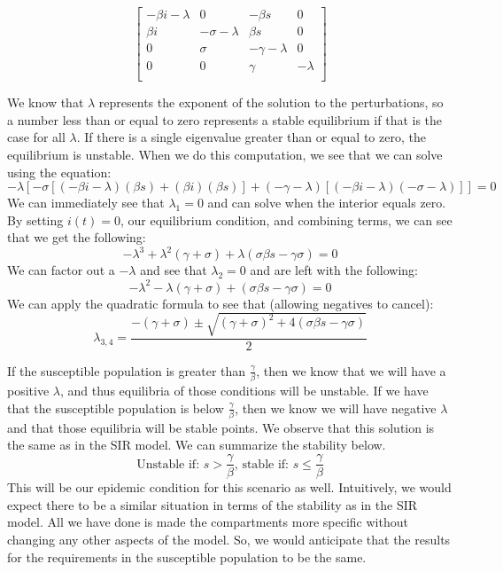 \documentclass[12pt, a4paper]{article}
\begin{document}
        $$\begin{bmatrix}
            -\beta i -\lambda & 0 & -\beta s & 0 \\
            \beta i & -\sigma -\lambda & \beta s & 0 \\
            0 & \sigma & -\gamma -\lambda & 0 \\
            0 & 0 & \gamma & -\lambda \\
        \end{bmatrix}$$
        
        We know that $\lambda$ represents the exponent of the solution to the perturbations, so a number less than or equal to zero represents a stable equilibrium if that is the case for all $\lambda$. If there is a single eigenvalue greater than or equal to zero, the equilibrium is unstable. When we do this computation, we see that we can solve using the equation:
        \[
        -\lambda [-\sigma[(-\beta i- \lambda)(\beta s) + (\beta i)(\beta s)]+(-\gamma-\lambda)[(-\beta i -\lambda)(-\sigma-\lambda)]]=0
        \]
        We can immediately see that $\lambda_1=0$ and can solve when the interior equals zero. By setting $i(t)=0$, our equilibrium condition, and combining terms, we can see that we get the following:
        \[
        -\lambda^3+\lambda^2(\gamma + \sigma)+\lambda(\sigma \beta s - \gamma \sigma)=0
        \]
        We can factor out a $-\lambda$ and see that $\lambda_2=0$ and are left with the following:
        \[
        -\lambda^2-\lambda(\gamma + \sigma)+(\sigma \beta s - \gamma \sigma)=0
        \]
        We can apply the quadratic formula to see that (allowing negatives to cancel):
        \[
        \lambda_{3,4}=\frac{-(\gamma + \sigma) \pm \sqrt{(\gamma + \sigma)^2 + 4(\sigma \beta s - \gamma\sigma)}}{2}
        \]
        
        If the susceptible population is greater than $\frac{\gamma}{\beta}$, then we know that we will have a positive $\lambda$, and thus equilibria of those conditions will be unstable. If we have that the susceptible population is below $\frac{\gamma}{\beta}$, then we know we will have negative $\lambda$ and that those equilibria will be stable points. We observe that this solution is the same as in the SIR model. We can summarize the stability below.
        \[
        \mbox{Unstable if: }s > \frac{\gamma}{\beta} \mbox{, stable if: }s \leq \frac{\gamma}{\beta}
        \]
        This will be our epidemic condition for this scenario as well. Intuitively, we would expect there to be a similar situation in terms of the stability as in the SIR model. All we have done is made the compartments more specific without changing any other aspects of the model. So, we would anticipate that the results for the requirements in the susceptible population to be the same.
        
\end{document}
